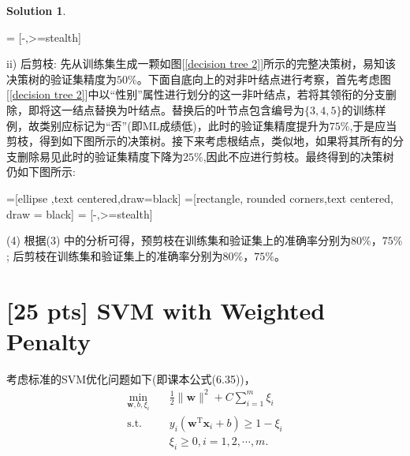 \documentclass[a4paper,UTF8]{article}
\theoremstyle{definition}
\newtheorem*{solution}{Solution}
\begin{document}
\begin{solution}
\begin{center}
 = [-,>=stealth]
\end{center}
ii) 后剪枝: 先从训练集生成一颗如图[\ref{decision tree 2}]所示的完整决策树，易知该决策树的验证集精度为$50\%$。下面自底向上的对非叶结点进行考察，首先考虑图[\ref{decision tree 2}]中以“性别”属性进行划分的这一非叶结点，若将其领衔的分支删除，即将这一结点替换为叶结点。替换后的叶节点包含编号为$\{3,4,5\}$的训练样例，故类别应标记为“否”(即ML成绩低)，此时的验证集精度提升为$75\%$,于是应当剪枝，得到如下图所示的决策树。接下来考虑根结点，类似地，如果将其所有的分支删除易见此时的验证集精度下降为$25\%$,因此不应进行剪枝。最终得到的决策树仍如下图所示:
\begin{center}
=[ellipse ,text centered,draw=black]
 =[rectangle, rounded corners,text centered, draw = black]
 = [-,>=stealth]
\end{center}
(4) 根据(3) 中的分析可得，预剪枝在训练集和验证集上的准确率分别为$80\%$，$75\%$; 后剪枝在训练集和验证集上的准确率分别为$80\%$，$75\%$。
\end{solution}

\section{[25 pts] SVM with Weighted Penalty}
考虑标准的SVM优化问题如下(即课本公式(6.35))，
\begin{equation}
\label{eq-svm}
\begin{split}
\min_{\mathbf{w},b,\xi_i}& \quad \frac{1}{2} \lVert \mathbf{w} \rVert^2 + C\sum_{i=1}^m\xi_i\\
\text{s.t.}&  \quad y_i(\mathbf{w}^\mathrm{T}\mathbf{x}_i + b)\geq 1-\xi_i\\
& \quad \xi_i \geq 0, i = 1,2,\cdots,m.
\end{split}
\end{equation}
\end{document}
